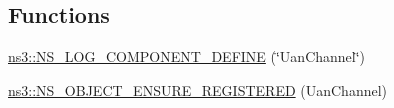 \subsection*{Functions}
\begin{DoxyCompactItemize}
\item 
\hyperlink{namespacens3_a2a10cd007074b316eee893d71e8540a3}{ns3\+::\+N\+S\+\_\+\+L\+O\+G\+\_\+\+C\+O\+M\+P\+O\+N\+E\+N\+T\+\_\+\+D\+E\+F\+I\+NE} (\char`\"{}Uan\+Channel\char`\"{})
\item 
\hyperlink{namespacens3_a2599cce4ab2a829a4e1731662d4d9f82}{ns3\+::\+N\+S\+\_\+\+O\+B\+J\+E\+C\+T\+\_\+\+E\+N\+S\+U\+R\+E\+\_\+\+R\+E\+G\+I\+S\+T\+E\+R\+ED} (Uan\+Channel)
\end{DoxyCompactItemize}
